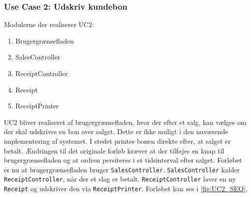 \subsubsection{Use Case 2: Udskriv kundebon}

Modulerne der realiserer UC2:
\begin{enumerate}
	\item Brugergrænsefladen
	\item SalesController
	\item ReceiptController
	\item Receipt
	\item ReceiptPrinter
\end{enumerate}

UC2 bliver realiseret af brugergrænsefladen, hvor der efter et salg, kan vælges om der skal udskrives en bon over salget. Dette er ikke muligt i den nuværende implementering af systemet. I stedet printes bonen direkte efter, at salget er betalt. Ændringen til det originale forløb kræver at der tilføjes en knap til brugergrænsefladen og at ordren persiteres i et tidsinterval efter salget. Forløbet er nu at brugergrænsefladen bruger \texttt{SalesController}. \texttt{SalesController} kalder \texttt{ReceiptController}, når der et slag er betalt. \texttt{ReceiptController} laver en ny \texttt{Receipt} og udskriver den via \texttt{ReceiptPrinter}. Forløbet kan ses i \ref{fig:UC2_SEQ}.

